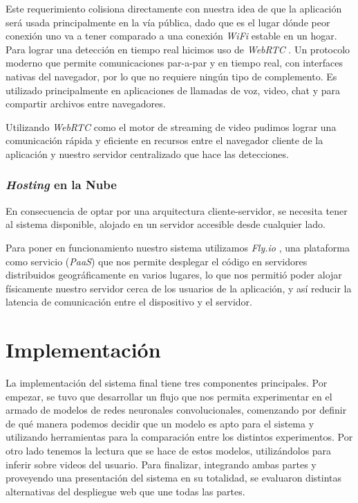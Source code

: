\documentclass[a4paper]{article}
\begin{document}
Este requerimiento colisiona directamente con nuestra idea de que la aplicación será usada principalmente en la vía pública, dado que es el lugar dónde peor conexión uno va a tener comparado a una conexión \textit{WiFi} estable en un hogar.\\

Para lograr una detección en tiempo real hicimos uso de \textit{WebRTC} \cite{webrtc}. Un protocolo moderno que permite comunicaciones par-a-par y en tiempo real, con interfaces nativas del navegador, por lo que no requiere ningún tipo de complemento. Es utilizado principalmente en aplicaciones de llamadas de voz, video, chat y para compartir archivos entre navegadores.

Utilizando \textit{WebRTC} como el motor de streaming de video pudimos lograr una comunicación rápida y eficiente en recursos entre el navegador cliente de la aplicación y nuestro servidor centralizado que hace las detecciones.

\subsubsection{\textit{Hosting} en la Nube}

En consecuencia de optar por una arquitectura cliente-servidor, se necesita tener al sistema disponible, alojado en un servidor accesible desde cualquier lado.

Para poner en funcionamiento nuestro sistema utilizamos \textit{Fly.io} \cite{flyio}, una plataforma como servicio (\textit{PaaS}) que nos permite desplegar el código en servidores distribuidos geográficamente en varios lugares, lo que nos permitió poder alojar físicamente nuestro servidor cerca de los usuarios de la aplicación, y así reducir la latencia de comunicación entre el dispositivo y el servidor.

\section{Implementación}

La implementación del sistema final tiene tres componentes principales. Por empezar, se tuvo que desarrollar un flujo que nos permita experimentar en el armado de modelos de redes neuronales convolucionales, comenzando por definir de qué manera podemos decidir que un modelo es apto para el sistema y utilizando herramientas para la comparación entre los distintos experimentos. Por otro lado tenemos la lectura que se hace de estos modelos, utilizándolos para inferir sobre videos del usuario. Para finalizar, integrando ambas partes y proveyendo una presentación del sistema en su totalidad, se evaluaron distintas alternativas del despliegue web que une todas las partes.
\end{document}
